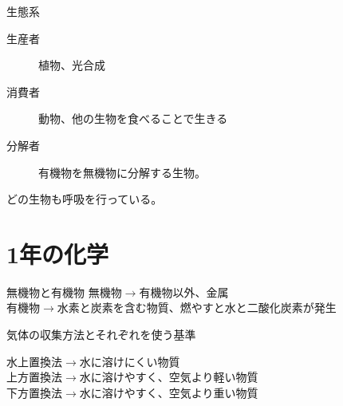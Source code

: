 \documentclass[10pt,dvipdfmx]{jsarticle}
\newcommand{\answer}[2]{{\color{orange}#2}}
\newcommand{\answer}[2]{\vspace{#1mm}}
\begin{document}
\begin{itembox}[l]{生態系}
	\answer{20}{
		\begin{description}
			\item[生産者] 植物、光合成
			\item[消費者] 動物、他の生物を食べることで生きる
			\item[分解者] 有機物を無機物に分解する生物。
		\end{description}
		どの生物も呼吸を行っている。
	}
\end{itembox}


\newpage

\section{1年の化学}

\begin{itembox}[l]{無機物と有機物}
	\answer{10}{
		無機物$\rightarrow$有機物以外、金属\\
		有機物$\rightarrow$水素と炭素を含む物質、燃やすと水と二酸化炭素が発生
	}
\end{itembox}

\begin{itembox}[l]{気体の収集方法とそれぞれを使う基準}
	\answer{20}{
		水上置換法$\rightarrow$水に溶けにくい物質\\
		上方置換法$\rightarrow$水に溶けやすく、空気より軽い物質\\
		下方置換法$\rightarrow$水に溶けやすく、空気より重い物質

	}
\end{itembox}
\end{document}
